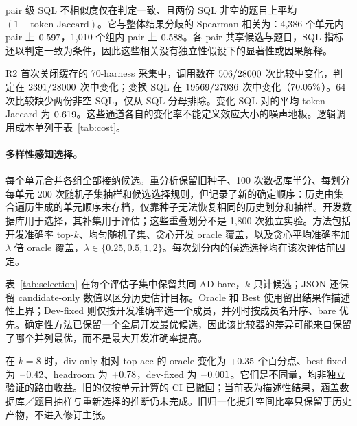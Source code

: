 pair 级 SQL 不相似度仅在判定一致、且两份 SQL 非空的题目上平均 $(1-\text{token-Jaccard})$。它与整体结果分歧的 Spearman 相关为：4,386 个单元内 pair 上 $0.597$，1,010 个组内 pair 上 $0.588$。各 pair 共享候选与题目，SQL 指标还以判定一致为条件，因此这些相关没有独立性假设下的显著性或因果解释。

R2 首次关闭缓存的 70-harness 采集中，调用数在 $506/28000$ 次比较中变化，判定在 $2391/28000$ 次中变化；变换 SQL 在 $19569/27936$ 次中变化（$70.05\%$）。64 次比较缺少两份非空 SQL，仅从 SQL 分母排除。变化 SQL 对的平均 token Jaccard 为 $0.619$。这些通道各自的变化率不能定义效应大小的噪声地板。逻辑调用成本单列于表~\ref{tab:cost}。
\paragraph{多样性感知选择。}每个单元合并各组全部接纳候选。重分析保留旧种子、100 次数据库半分、每划分每单元 200 次随机子集抽样和候选选择规则，但记录了新的确定顺序：历史由集合遍历生成的单元顺序未存档，仅靠种子无法恢复相同的历史划分和抽样。开发数据库用于选择，其补集用于评估；这些重叠划分不是 1,800 次独立实验。方法包括开发准确率 top-$k$、均匀随机子集、贪心开发 oracle 覆盖，以及贪心平均准确率加 $\lambda$ 倍 oracle 覆盖，$\lambda\in\{0.25,0.5,1,2\}$。每次划分内的候选选择均在该次评估前固定。

表~\ref{tab:selection} 在每个评估子集中保留共同 AD bare，$k$ 只计候选；JSON 还保留 candidate-only 数值以区分历史估计目标。Oracle 和 Best 使用留出结果作描述性上界；Dev-fixed 则仅按开发准确率选一个成员，并列时按成员名升序、bare 优先。确定性方法已保留一个全局开发最优候选，因此该比较器的差异可能来自保留了哪个并列最优，而不是最大开发准确率提高。

在 $k=8$ 时，div-only 相对 top-acc 的 oracle 变化为 $+0.35$ 个百分点、best-fixed 为 $-0.42$、headroom 为 $+0.78$，dev-fixed 为 $-0.001$。它们是不同量，均非独立验证的路由收益。旧的仅按单元计算的 CI 已撤回；当前表为描述性结果，涵盖数据库／题目抽样与重新选择的推断仍未完成。旧归一化提升空间比率只保留于历史产物，不进入修订主张。
\begin{table}[t]\centering\small

\caption{canonical 描述性 W1 重分析。每池含 $k$ 个已选候选及共同 bare；对 18 单元、100 个重叠数据库划分取均值，无 CI。Dev-fixed 仅在开发数据上选择；Best 使用留出结果。}\label{tab:selection}
\end{table}

